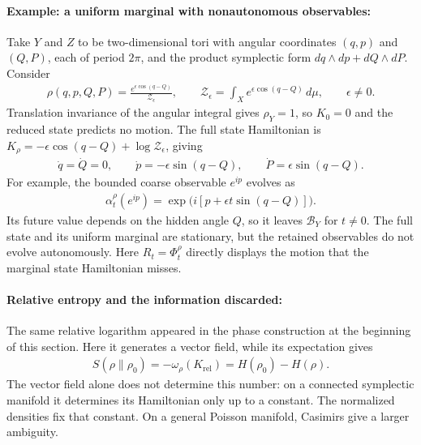 \documentclass[a4paper,11pt]{article}
\theoremstyle{definition}
\newcommand{\mB}{\mathcal{B}}
\begin{document}
\paragraph{Example: a uniform marginal with nonautonomous observables:}
Take $Y$ and $Z$ to be two-dimensional tori with angular coordinates $(q,p)$ and $(Q,P)$, each of period $2\pi$, and the product symplectic form $dq\wedge dp+dQ\wedge dP$. Consider
\begin{align}
    \rho(q,p,Q,P)=\frac{e^{\epsilon\cos(q-Q)}}{\mathcal Z_\epsilon},
    \qquad
    \mathcal Z_\epsilon=\int_X e^{\epsilon\cos(q-Q)}\,d\mu,
    \qquad \epsilon\ne0.
\end{align}
Translation invariance of the angular integral gives $\rho_Y=1$, so $K_0=0$ and the reduced state predicts no motion. The full state Hamiltonian is $K_\rho=-\epsilon\cos(q-Q)+\log\mathcal Z_\epsilon$, giving
\begin{align}
    \dot q=\dot Q=0,\qquad
    \dot p=-\epsilon\sin(q-Q),\qquad
    \dot P=\epsilon\sin(q-Q).
\end{align}
For example, the bounded coarse observable $e^{ip}$ evolves as
\begin{align}
    \alpha_t^\rho(e^{ip})
    =\exp\bigl(i[p+\epsilon t\sin(q-Q)]\bigr).
\end{align}
Its future value depends on the hidden angle $Q$, so it leaves $\mB_Y$ for $t\ne0$. The full state and its uniform marginal are stationary, but the retained observables do not evolve autonomously. Here $R_t=\Phi_t^\rho$ directly displays the motion that the marginal state Hamiltonian misses.

\paragraph{Relative entropy and the information discarded:}
The same relative logarithm appeared in the phase construction at the beginning of this section. Here it generates a vector field, while its expectation gives
\begin{align}\label{eq:classical-relative-entropy-Hamiltonian}
    S(\rho\|\rho_0)=-\omega_\rho(K_{\mathrm{rel}})
    =H(\rho_0)-H(\rho).
\end{align}
The vector field alone does not determine this number: on a connected symplectic manifold it determines its Hamiltonian only up to a constant. The normalized densities fix that constant. On a general Poisson manifold, Casimirs give a larger ambiguity.
\end{document}
